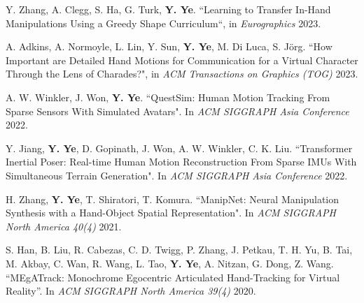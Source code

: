 \documentclass[margin,line]{res}
\begin{document}
\begin{resume}
\vspace*{-.1in}
Y. Zhang, A. Clegg, S. Ha, G. Turk, {\bf Y. Ye}. ``Learning to Transfer In-Hand Manipulations Using a Greedy Shape Curriculum``, in {\em Eurographics} 2023.

\vspace*{-.1in}
A. Adkins, A. Normoyle, L. Lin, Y. Sun, {\bf Y. Ye}, M. Di Luca, S. J\"{o}rg. ``How Important are Detailed Hand Motions for Communication for a Virtual Character Through the Lens of Charades?", in {\em ACM Transactions on Graphics (TOG)} 2023.


\vspace*{-.1in}
A. W. Winkler, J. Won, {\bf Y. Ye}. ``QuestSim: Human Motion Tracking From Sparse Sensors With Simulated Avatars". In {\em ACM SIGGRAPH Asia Conference} 2022.

\vspace*{-.1in}
Y. Jiang, {\bf Y. Ye}, D. Gopinath, J. Won, A. W. Winkler, C. K. Liu. ``Transformer Inertial Poser: Real-time Human Motion Reconstruction From Sparse IMUs With Simultaneous Terrain Generation". In {\em ACM SIGGRAPH Asia Conference} 2022.


\vspace*{-.1in}
H. Zhang, {\bf Y. Ye}, T. Shiratori, T. Komura. ``ManipNet: Neural Manipulation Synthesis with a Hand-Object Spatial Representation". In {\em ACM SIGGRAPH North America 40(4)} 2021.


\vspace*{-.1in}
S. Han, B. Liu, R. Cabezas, C. D. Twigg, P. Zhang, J. Petkau, T. H. Yu, B. Tai, M. Akbay, C. Wan, R. Wang, L. Tao, {\bf Y. Ye}, A. Nitzan, G. Dong, Z. Wang. ``MEgATrack: Monochrome Egocentric Articulated Hand-Tracking for Virtual Reality''. In {\em ACM SIGGRAPH North America 39(4)} 2020.


\end{resume}
\end{document}
